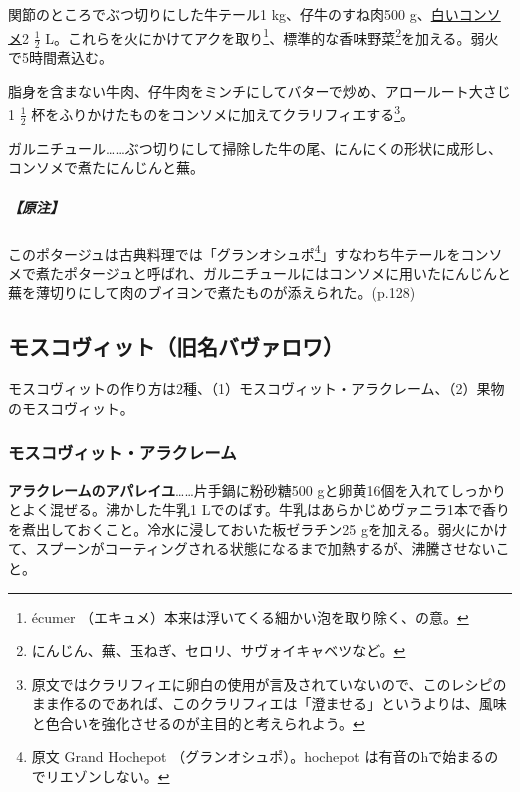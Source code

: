 関節のところでぶつ切りにした牛テール1 kg、仔牛のすね肉500
g、\protect\hyperlink{consomme-blanc-simple}{白いコンソメ}2
\(\frac{1}{2}\) L。これらを火にかけてアクを取り\footnote{écumer
  （エキュメ）本来は浮いてくる細かい泡を取り除く、の意。}、標準的な香味野菜\footnote{にんじん、蕪、玉ねぎ、セロリ、サヴォイキャベツなど。}を加える。弱火で5時間煮込む。

脂身を含まない牛肉、仔牛肉をミンチにしてバターで炒め、アロールート大さじ1
\(\frac{1}{2}\)
杯をふりかけたものをコンソメに加えてクラリフィエする\footnote{原文ではクラリフィエに卵白の使用が言及されていないので、このレシピのまま作るのであれば、このクラリフィエは「澄ませる」というよりは、風味と色合いを強化させるのが主目的と考えられよう。}。

ガルニチュール\ldots{}\ldots{}ぶつ切りにして掃除した牛の尾、にんにくの形状に成形し、コンソメで煮たにんじんと蕪。

\hypertarget{ux539fux6ce8}{%
\subparagraph{【原注】}\label{ux539fux6ce8}}

このポタージュは古典料理では「グランオシュポ\footnote{原文 Grand
  Hochepot （グランオシュポ）。hochepot
  は有音のhで始まるのでリエゾンしない。}」すなわち牛テールをコンソメで煮たポタージュと呼ばれ、ガルニチュールにはコンソメに用いたにんじんと蕪を薄切りにして肉のブイヨンで煮たものが添えられた。(p.128)

\hypertarget{moscovite}{%
\subsection{モスコヴィット（旧名バヴァロワ）}\label{moscovite}}

\href{ex.Bavarois\%20を料理名としてどう扱うか要検討}{}

モスコヴィットの作り方は2種、（1）モスコヴィット・アラクレーム、（2）果物のモスコヴィット。

\hypertarget{moscovite-a-la-creme}{%
\subsubsection{モスコヴィット・アラクレーム}\label{moscovite-a-la-creme}}



\textbf{アラクレームのアパレイユ}\ldots{}\ldots{}片手鍋に粉砂糖500
gと卵黄16個を入れてしっかりとよく混ぜる。沸かした牛乳1
Lでのばす。牛乳はあらかじめヴァニラ1本で香りを煮出しておくこと。冷水に浸しておいた板ゼラチン25
gを加える。弱火にかけて、スプーンがコーティングされる状態になるまで加熱するが、沸騰させないこと。

